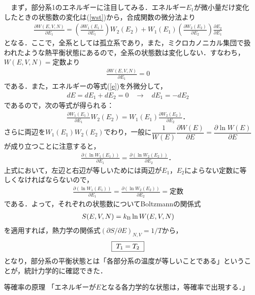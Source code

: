 　まず，部分系1のエネルギーに注目してみる．エネルギー$E_1$が微小量だけ変化したときの状態数の変化は(\ref{wst})から，合成関数の微分法より
　\begin{align}
\label{te1}
\frac{\partial W(E,V,N)}{\partial E_1}
=\left(\frac{\partial W_1(E_1)}{\partial E_1}\right)W_2(E_2)+W_1(E_1)\left(\frac{\partial W_2(E_2)}{\partial E_2}\right)\frac{\partial E_2}{\partial E_1}
\end{align}
となる．ここで，全系としては孤立系であり，また，ミクロカノニカル集団で扱われたような熱平衡状態にあるので，全系の状態数は変化しない．すなわち，$W(E,V,N)=$定数より
\begin{align}\label{te2}
\frac{\partial W(E,V,N)}{\partial E_1}=0
\end{align}
である．また，エネルギーの等式(\ref{e})を外微分して，
\begin{align}\label{eg}
dE=dE_1+dE_2=0\ \ \ \ \to \ \ \ \ dE_1=-dE_2
\end{align}
であるので，次の等式が得られる：
\begin{align}
\frac{\partial W_1(E_1)}{\partial E_1}W_2(E_2)=W_1(E_1)\frac{\partial W_2(E_2)}{\partial E_2}．
\end{align}
さらに両辺を$W_1(E_1)W_2(E_2)$でわり，一般に$\dfrac{1}{W(E)}\dfrac{\partial W(E)}{\partial E}=\dfrac{\partial \ln W(E)}{\partial E}$が成り立つことに注意すると，
\begin{align}
\frac{\partial (\ln W_1(E_1))}{\partial E_1}=\frac{\partial (\ln W_2(E_2))}{\partial E_2}．
\end{align}
上式において，左辺と右辺が等しいためには両辺が$E_1$，$E_2$によらない定数に等しくなければならないので，
\begin{align}\label{te2}
\frac{\partial (\ln W_1(E_1))}{\partial E_1}=\frac{\partial (\ln W_2(E_2))}{\partial E_2}=\text{定数}
\end{align}
である．よって，それぞれの状態数についてBoltzmannの関係式
\begin{align}\label{bol}
S(E,V,N)=k_{\rm B}\ln W(E,V,N)
\end{align}
を適用すれば，熱力学の関係式$(\partial S/\partial E)_{N,V}=1/T$から，
\begin{align}
\label{te}
\fbox{
$T_1=T_2$
}
\end{align}
となり，部分系の平衡状態とは「各部分系の温度が等しいことである」ということが，統計力学的に確認できた．
　\begin{itembox}[l]{等確率の原理}
「エネルギーが$E$となる各力学的な状態は，等確率で出現する．」
\end{itembox}



























